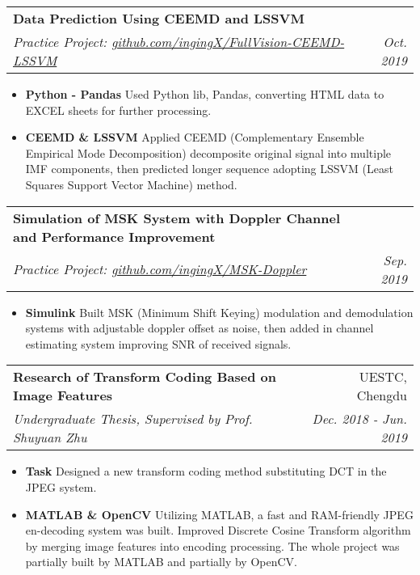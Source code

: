 \documentclass[9pt, a4paper]{article}
\makeatletter
\newcommand{\resumeItem}[2]{
  \item\small{
    \textbf{#1}{ #2 \vspace{-2pt}}
  }
}
\newcommand{\resumeSubheading}[4]{
  \vspace{-1pt}\item
    \begin{tabular*}{0.97\textwidth}{l@{\extracolsep{\fill}}r}
      \textbf{#1} & #2 \\
      \textit{\small#3} & \textit{\small #4} \\
    \end{tabular*}\vspace{-5pt}
}
\newcommand{\resumeItemListStart}{\begin{itemize}}
\newcommand{\resumeItemListEnd}{\end{itemize}\vspace{-5pt}}
\makeatother
\begin{document}
    \resumeSubheading
      {Data Prediction Using CEEMD and LSSVM}{}
      {Practice Project: \href{https://github.com/ingingX/FullVision-CEEMD-LSSVM}{github.com/ingingX/FullVision-CEEMD-LSSVM}}{Oct. 2019}
      \resumeItemListStart
        \resumeItem{Python - Pandas}
          {Used Python lib, Pandas, converting HTML data to EXCEL sheets for further processing.}
        \resumeItem{CEEMD \& LSSVM}
          {Applied CEEMD (Complementary Ensemble Empirical Mode Decomposition) decomposite original signal into multiple IMF components, then predicted longer sequence adopting LSSVM (Least Squares Support Vector Machine) method.}
      \resumeItemListEnd

    \resumeSubheading
      {Simulation of MSK System with Doppler Channel and Performance Improvement}{}
      {Practice Project: \href{https://github.com/ingingX/MSK-Doppler}{github.com/ingingX/MSK-Doppler}}{Sep. 2019}
      \resumeItemListStart
        \resumeItem{Simulink}
          {Built MSK (Minimum Shift Keying) modulation and demodulation systems with adjustable doppler offset as noise, then added in channel estimating system improving SNR of received signals. }
      \resumeItemListEnd


    \resumeSubheading
      {Research of Transform Coding Based on Image Features}{UESTC, Chengdu}
      {Undergraduate Thesis, Supervised by Prof. Shuyuan Zhu}{Dec. 2018 - Jun. 2019}
      \resumeItemListStart
        \resumeItem{Task}
          {Designed a new transform coding method substituting DCT in the JPEG system.}
        \resumeItem{MATLAB \& OpenCV}
          {Utilizing MATLAB, a fast and RAM-friendly JPEG en-decoding system was built. Improved Discrete Cosine Transform algorithm by merging image features into encoding processing. The whole project was partially built by MATLAB and partially by OpenCV.}
      \resumeItemListEnd
\end{document}
